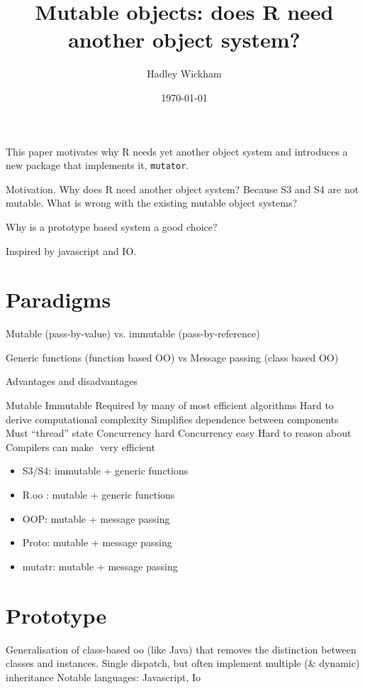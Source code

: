 \documentclass[oneside]{article}
\title{Mutable objects: does R need another object system?}
\author{Hadley Wickham}
\date{\today}
\begin{document}
\maketitle 

This paper motivates why R needs yet another object system and introduces a new package that implements it, \verb|mutator|.

Motivation.  Why does R need another object system?  Because S3 and S4 are not mutable.  What is wrong with the existing mutable object systems?

Why is a prototype based system a good choice?

Inspired by javascript and IO.  


\section{Paradigms}
\label{sec:paradigms}

\citep{roy:2004,van-roy:2009}

Mutable (pass-by-value) vs. immutable (pass-by-reference)

Generic functions (function based OO) vs Message passing
(class based OO)

Advantages and disadvantages

Mutable	Immutable
Required by many of most efficient algorithms	Hard to derive computational complexity
Simplifies dependence between components	Must “thread” state
Concurrency hard	Concurrency easy
Hard to reason about	Compilers can make  very efficient

\begin{itemize}
  \item S3/S4: immutable + generic functions
  \item R.oo : mutable + generic functions
  \item OOP: mutable + message passing
  \item Proto: mutable + message passing
  \item mutatr: mutable + message passing
\end{itemize}

\section{Prototype}
\label{sec:prototype}

Generalisation of class-based oo (like Java) that removes the distinction between classes and instances.
Single dispatch, but often implement multiple (& dynamic) inheritance
Notable languages: Javascript, Io
\end{document}
